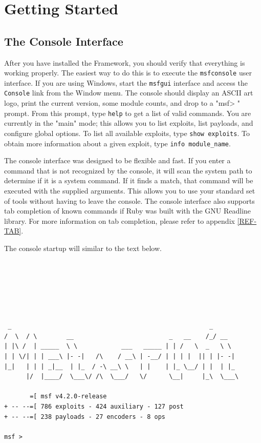 \documentclass{report}
\begin{document}
\pagebreak

\chapter{Getting Started}

    \section{The Console Interface}
    \label{STARTED-CONSOLE}

\par
After you have installed the Framework, you should verify that everything is
working properly. The easiest way to do this is to execute the
\texttt{msfconsole} user interface. If you are using Windows, start the
\texttt{msfgui} interface and access the \texttt{Console} link from the Window
menu. The console should display an ASCII art logo, print the current version,
some module counts, and drop to a "msf> " prompt. From this prompt, type
\texttt{help} to get a list of valid commands. You are currently in the "main"
mode; this allows you to list exploits, list payloads, and configure global
options. To list all available exploits, type \texttt{show exploits}. To obtain
more information about a given exploit, type \texttt{info module\_name}.

\par
The console interface was designed to be flexible and fast. If you enter a
command that is not recognized by the console, it will scan the system path to
determine if it is a system command. If it finds a match, that command will be
executed with the supplied arguments. This allows you to use your standard set
of tools without having to leave the console. The console interface also
supports tab completion of known commands if Ruby was built with the GNU
Readline library. For more information on tab completion, please refer to
appendix \ref{REF-TAB}.

\par
The console startup will similar to the text below.

\begin{verbatim}






 _                                                      _
/  \  / \        __                          _   __    /_/ __
| |\ /  | _____  \ \            ___   _____ | | /   \  _   \ \
| | \/| | | ___\ |- -|   /\    / __\ | -__/ | | | |  || | |- -|
|_|   | | | _|__  | |_  / -\ __\ \   | |    | |_ \__/ | |  | |_
      |/  |____/  \___\/ /\  \___/   \/      \__|     |_\  \___\

       =[ msf v4.2.0-release
+ -- --=[ 786 exploits - 424 auxiliary - 127 post
+ -- --=[ 238 payloads - 27 encoders - 8 ops

msf >
\end{verbatim}
\end{document}
